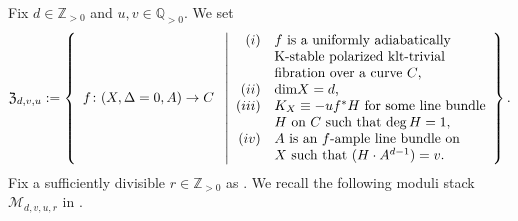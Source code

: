 \documentclass[12pt,twoside]{amsart}
\theoremstyle{definition}
\begin{document}
Fix $d\in\mathbb{Z}_{>0}$ and $u,v\in\mathbb{Q}_{>0}$.
We set  $$\mathfrak{Z}_{d, v,u}:=\left\{
\begin{array}{l}
f\colon (X,\Delta=0,A) \to C
\end{array}
\;\middle|
\begin{array}{rl}
(i)&\text{$f$ is a uniformly adiabatically}\\
&\text{K-stable polarized klt-trivial} \\
&\text{fibration over a curve $C$,}\\
(ii)&\text{${\rm dim}X=d$,}\\
(iii)&\text{$K_X\equiv -uf^*H$ for some line bundle} \\
&\text{$H$ on $C$ such that $\mathrm{deg}\,H=1$,} \\
(iv)&\text{$A$ is an $f$-ample line bundle on}\\
&\text{$X$ such that $(H\cdot A^{d-1})=v$.}
\end{array}\right\}.$$
Fix a sufficiently divisible $r\in\mathbb{Z}_{>0}$ as \cite[Lemma 3.1]{HH}.
We recall the following moduli stack $\mathcal{M}_{d,v,u,r}$ in \cite{HH}.
\end{document}
